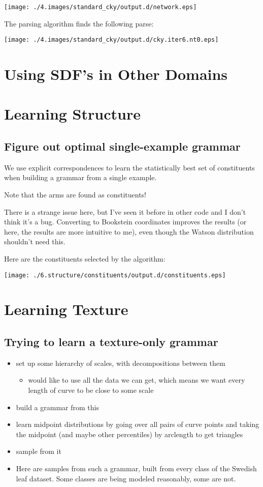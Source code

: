 \documentclass{book}
\begin{document}
\texttt{[image: ./4.images/standard\_cky/output.d/network.eps]}

The parsing algorithm finds the following parse:

\texttt{[image: ./4.images/standard\_cky/output.d/cky.iter6.nt0.eps]}
\section{Using SDF's in Other Domains}
\label{sec-2_6}
\section{Learning Structure}
\label{sec-2_7}
\subsection{Figure out optimal single-example grammar}
\label{sec-2_7_1}


We use explicit correspondences to learn the statistically best set of
constituents when building a grammar from a single example.

Note that the arms are found as constituents!

There is a strange issue here, but I've seen it before in other code
and I don't think it's a bug. Converting to Bookstein coordinates
improves the results (or here, the results are more intuitive to me),
even though the Watson distribution shouldn't need this.

Here are the constituents selected by the algorithm:

\texttt{[image: ./6.structure/constituents/output.d/constituents.eps]}
\section{Learning Texture}
\label{sec-2_8}
\subsection{Trying to learn a texture-only grammar}
\label{sec-2_8_1}

\begin{itemize}
\item set up some hierarchy of scales, with decompositions between them

\begin{itemize}
\item would like to use all the data we can get, which means we want
      every length of curve to be close to some scale
\end{itemize}

\item build a grammar from this
\item learn midpoint distributions by going over all pairs of curve
    points and taking the midpoint (and maybe other percentiles) by
    arclength to get triangles
\item sample from it
\item Here are samples from such a grammar, built from every class of
    the Swedish leaf dataset. Some classes are being modeled
    reasonably, some are not.
\end{itemize}
\end{document}
